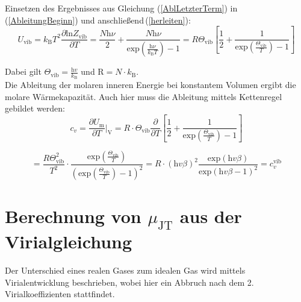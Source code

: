 \documentclass[a4paper,12pt,oneside,onecolum,final,openany]{report}
\begin{document}
Einsetzen des Ergebnisses aus Gleichung (\ref{AblLetzterTerm}) in (\ref{AbleitungBeginn}) und anschließend\,(\ref{herleiten}):\\

\begin{equation}
U_\mathrm{vib}= k_\mathrm{B}T^2 \frac{\partial \mathrm{ln}Z_\mathrm{vib}}{\partial T}=  \frac{N\mathrm{\mathrm{h}}\nu}{2} + \frac{N \mathrm{\mathrm{h}}\nu}{\mathrm{exp}(\frac{\mathrm{\mathrm{h}}\nu}{k_\mathrm{B}T})-1}= R \Theta_\mathrm{vib} \left[ \frac{1}{2} + \frac{1}{\mathrm{exp}(\frac{\Theta_\mathrm{vib}}{T}) -1}\right]
\end{equation}

Dabei gilt $\Theta_\mathrm{vib} = \frac{\mathrm{h}v}{k_\mathrm{B}}$ und $\mathrm{R}=N \cdot k_\mathrm{B}$.\\  


Die Ableitung der molaren inneren Energie bei konstantem Volumen ergibt die molare Wärmekapazität. Auch hier muss die Ableitung mittels Kettenregel gebildet werden:\\


\begin{equation}
c_v = \frac{\partial U_\mathrm{m}}{\partial T}\bigg \vert_\mathrm{V} =R\cdot \Theta_\mathrm{vib} \frac{\partial}{\partial T} \left[\frac{1}{2} + \frac{1}{\mathrm{exp}(\frac{\Theta_\mathrm{vib}}{T})-1} \right]  
\end{equation}


\begin{equation}
= \frac{R\Theta^2_\mathrm{vib}}{T^2} \cdot \frac{\mathrm{exp}(\frac{\Theta_\mathrm{vib}}{T})}{(\mathrm{exp}(\frac{\Theta_\mathrm{vib}}{T})-1)^2}
 = R\cdot(\mathrm{h}v\beta)^2 \frac{\mathrm{exp}(\mathrm{h}v\beta)}{\mathrm{exp}(\mathrm{h}v\beta -1)^2} =c_v^\mathrm{vib}
\end{equation}


\section{Berechnung von $\mu_\mathrm{JT}$ aus der Virialgleichung}

Der Unterschied eines realen Gases zum idealen Gas wird mittels Virialentwicklung beschrieben, wobei hier ein Abbruch nach dem 2. Virialkoeffizienten stattfindet.\\
\end{document}
